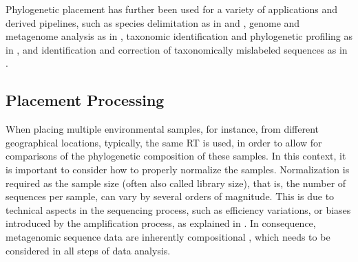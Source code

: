 Phylogenetic placement has further been used for a variety of applications and derived pipelines, such as
species delimitation as in  \cite{Zhang2013} and  \cite{Kapli2017},
genome and metagenome analysis as in  \cite{Darling2014},
taxonomic identification and phylogenetic profiling as in  \cite{Nguyen2014}, and
identification and correction of taxonomically mislabeled sequences as in  \cite{Kozlov2016}.



\subsection{Placement Processing}
\label{ch:Foundations:sec:PhylogeneticPlacement:sub:PlacementProcessing}


When placing multiple environmental samples, for instance, from different geographical locations,
typically, the same \ac{RT} is used, in order to allow for comparisons of the phylogenetic composition of these samples.
In this context, it is important to consider how to properly normalize the samples.
Normalization is required as the sample size (often also called library size),
that is, the number of sequences per sample, can vary by several orders of magnitude.
This is due to technical aspects in the sequencing process, such as efficiency variations,
or biases introduced by the amplification process,
as explained in .
In consequence, metagenomic sequence data are inherently compositional \cite{Gloor2017},
which needs to be considered in all steps of data analysis.

